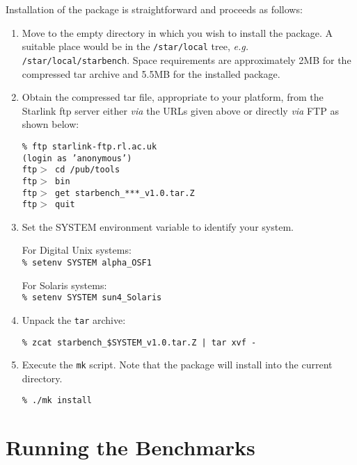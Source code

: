 \documentclass[11pt]{article}
\newcommand{\pkgver}     {v1.0}
\newcommand{\pkgftpdir}  {/pub/tools}
\newcommand{\pkgftpsrv} {starlink-ftp.rl.ac.uk}
\begin{document}
Installation of the package is straightforward and proceeds as follows:

\begin{enumerate}
\item Move to the empty directory in which you wish to install the package.
A suitable place would be in the {\tt /star/local} tree, {\em e.g.} 
{\tt /star/local/starbench}. Space requirements are approximately 2MB for
the compressed tar archive and 5.5MB for the installed package.

\item Obtain the compressed tar file, appropriate to your platform, from the Starlink ftp server either {\em via} the URLs given above or directly {\em via} FTP as shown below:

{\tt    \% ftp \pkgftpsrv            \\
        (login as 'anonymous')                 \\
        ftp$>$ cd \pkgftpdir                   \\
        ftp$>$ bin                             \\
        ftp$>$ get starbench\_***\_\pkgver.tar.Z   \\
        ftp$>$ quit }

\item Set the SYSTEM environment variable to identify your system. 

For Digital Unix systems: \\
{\tt \% setenv SYSTEM alpha\_OSF1}

For Solaris systems: \\
{\tt \% setenv SYSTEM sun4\_Solaris}

\item Unpack the {\tt tar} archive:

{\tt \% zcat starbench\_\$SYSTEM\_\pkgver.tar.Z | tar xvf - }

\item Execute the {\tt mk} script. Note that the package will install into the
current directory.

{\tt \% ./mk install}
\end{enumerate}


\section{Running the Benchmarks}
\end{document}
